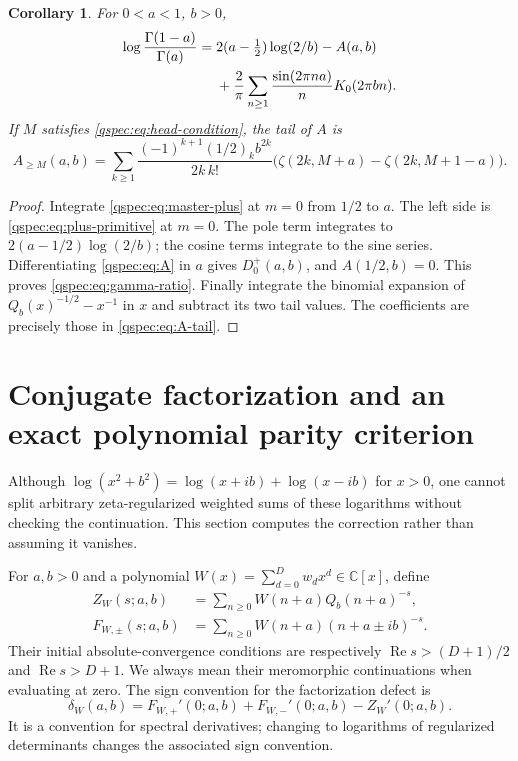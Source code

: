 \documentclass[11pt,letterpaper]{article}
\numberwithin{equation}{section}
\newtheorem{corollary}[theorem]{Corollary}
\theoremstyle{definition}
\newcommand{\Rea}{\operatorname{Re}}
\newcommand{\C}{\mathbb C}
\begin{document}
\begin{corollary}\label{qspec:cor:gamma-ratio}
For $0<a<1$, $b>0$,
\begin{align}
\log\frac{\Gamma(1-a)}{\Gamma(a)}={}&
2(a-\tfrac12)\log(2/b)-A(a,b)\notag\\
&+\frac2\pi\sum_{n\ge1}\frac{\sin(2\pi na)}nK_0(2\pi bn).
\label{qspec:eq:gamma-ratio}
\end{align}
If $M$ satisfies \eqref{qspec:eq:head-condition}, the tail of $A$ is
\begin{equation}\label{qspec:eq:A-tail}
A_{\ge M}(a,b)=\sum_{k\ge1}
\frac{(-1)^{k+1}(1/2)_k b^{2k}}{2k\,k!}
\bigl(\zeta(2k,M+a)-\zeta(2k,M+1-a)\bigr).
\end{equation}
\end{corollary}
\begin{proof}
Integrate \eqref{qspec:eq:master-plus} at $m=0$ from $1/2$ to $a$.
The left side is \eqref{qspec:eq:plus-primitive} at $m=0$.
The pole term integrates to $2(a-1/2)\log(2/b)$; the cosine terms
integrate to the sine series. Differentiating \eqref{qspec:eq:A} in $a$
gives $D_0^+(a,b)$, and $A(1/2,b)=0$. This proves
\eqref{qspec:eq:gamma-ratio}. Finally integrate the binomial expansion
of $Q_b(x)^{-1/2}-x^{-1}$ in $x$ and subtract its two tail values.
The coefficients are precisely those in \eqref{qspec:eq:A-tail}.
\end{proof}


\section{Conjugate factorization and an exact polynomial parity criterion}
\label{qspec:sec:anomaly}

Although $\log(x^2+b^2)=\log(x+ib)+\log(x-ib)$ for $x>0$, one cannot
split arbitrary zeta-regularized weighted sums of these logarithms without
checking the continuation. This section computes the correction rather
than assuming it vanishes.

For $a,b>0$ and a polynomial $W(x)=\sum_{d=0}^D w_dx^d\in\C[x]$, define
\begin{align}
Z_W(s;a,b)&=\sum_{n\ge0}W(n+a)Q_b(n+a)^{-s},\label{qspec:eq:weighted-quadratic}\\
F_{W,\pm}(s;a,b)&=\sum_{n\ge0}W(n+a)(n+a\pm ib)^{-s}.
\label{qspec:eq:weighted-linear}
\end{align}
Their initial absolute-convergence conditions are respectively
$\Rea s>(D+1)/2$ and $\Rea s>D+1$. We always mean their meromorphic
continuations when evaluating at zero. The sign convention for the
factorization defect is
\begin{equation}\label{qspec:eq:delta-definition}
\delta_W(a,b)=F_{W,+}'(0;a,b)+F_{W,-}'(0;a,b)-Z_W'(0;a,b).
\end{equation}
It is a convention for spectral derivatives; changing to logarithms of
regularized determinants changes the associated sign convention.
\end{document}
